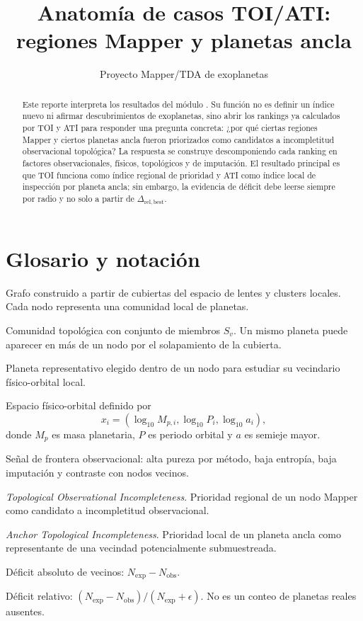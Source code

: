 \documentclass[11pt]{article}
\title{Anatomía de casos TOI/ATI: regiones Mapper y planetas ancla}
\author{Proyecto Mapper/TDA de exoplanetas}
\date{}
\newcommand{\code}[1]{\texttt{\detokenize{#1}}}
\begin{document}
\maketitle

\begin{abstract}
Este reporte interpreta los resultados del módulo \code{toi_ati_case_anatomy}. Su función no es definir un índice nuevo ni afirmar descubrimientos de exoplanetas, sino abrir los rankings ya calculados por TOI y ATI para responder una pregunta concreta: ¿por qué ciertas regiones Mapper y ciertos planetas ancla fueron priorizados como candidatos a incompletitud observacional topológica? La respuesta se construye descomponiendo cada ranking en factores observacionales, físicos, topológicos y de imputación. El resultado principal es que TOI funciona como índice regional de prioridad y ATI como índice local de inspección por planeta ancla; sin embargo, la evidencia de déficit debe leerse siempre por radio y no solo a partir de $\Delta_{\mathrm{rel,best}}$.
\end{abstract}

\section{Glosario y notación}

\begin{description}[leftmargin=3.1cm,style=nextline]
    \item[Mapper] Grafo construido a partir de cubiertas del espacio de lentes y clusters locales. Cada nodo representa una comunidad local de planetas.
    \item[Nodo Mapper $v$] Comunidad topológica con conjunto de miembros $S_v$. Un mismo planeta puede aparecer en más de un nodo por el solapamiento de la cubierta.
    \item[Planeta ancla $p^*$] Planeta representativo elegido dentro de un nodo para estudiar su vecindario físico-orbital local.
    \item[Espacio $R^3$] Espacio físico-orbital definido por
    \[
    x_i=(\log_{10}M_{p,i},\log_{10}P_i,\log_{10}a_i),
    \]
    donde $M_p$ es masa planetaria, $P$ es periodo orbital y $a$ es semieje mayor.
    \item[Sombra observacional] Señal de frontera observacional: alta pureza por método, baja entropía, baja imputación y contraste con nodos vecinos.
    \item[TOI] \emph{Topological Observational Incompleteness}. Prioridad regional de un nodo Mapper como candidato a incompletitud observacional.
    \item[ATI] \emph{Anchor Topological Incompleteness}. Prioridad local de un planeta ancla como representante de una vecindad potencialmente submuestreada.
    \item[$\Delta N$] Déficit absoluto de vecinos: $N_{\mathrm{exp}}-N_{\mathrm{obs}}$.
    \item[$\Delta_{\mathrm{rel}}$] Déficit relativo: $(N_{\mathrm{exp}}-N_{\mathrm{obs}})/(N_{\mathrm{exp}}+\epsilon)$. No es un conteo de planetas reales ausentes.
\end{description}
\end{document}
